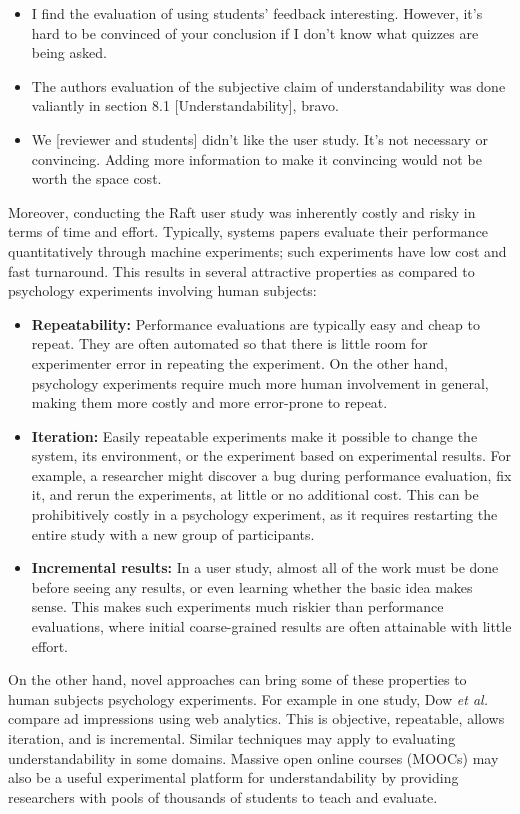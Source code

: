 \begin{itemize}
\item I find the evaluation of using students' feedback interesting.
However, it's hard to be convinced of your conclusion if I don't know
what quizzes are being asked.

\item The authors evaluation of the subjective claim of
understandability was done valiantly in section 8.1 [Understandability],
bravo.

\item We [reviewer and students] didn't like the user study. It's not
necessary or convincing. Adding more information to make it convincing
would not be worth the space cost.

\end{itemize}

Moreover, conducting the Raft user study was inherently costly and risky
in terms of time and effort. Typically, systems papers evaluate their
performance quantitatively through machine experiments; such experiments
have low cost and fast turnaround. This results in several attractive
properties as compared to psychology experiments involving human
subjects:
\begin{itemize}
\item \textbf{Repeatability:} Performance evaluations are typically
easy and cheap to repeat. They are often automated so that there is
little room for experimenter error in repeating the experiment. On the
other hand, psychology experiments require much more human involvement
in general, making them more costly and more error-prone to repeat.
\item \textbf{Iteration:} Easily repeatable experiments make it possible
to change the system, its environment, or the experiment based on
experimental results. For example, a researcher might discover a bug
during performance evaluation, fix it, and rerun the experiments, at
little or no additional cost. This can be prohibitively costly in a psychology
experiment, as it requires restarting the entire study with a new group
of participants.
\item \textbf{Incremental results:} In a user study, almost all of the
work must be done before seeing any results, or even learning whether
the basic idea makes sense. This makes such experiments much riskier
than performance evaluations, where initial coarse-grained results are
often attainable with little effort.
\end{itemize}

On the other hand, novel approaches can bring some of these properties
to human subjects psychology experiments. For example in one study, Dow
\emph{et al.}~\cite{Dow:2010} compare ad impressions using web
analytics. This is objective, repeatable, allows iteration, and is
incremental. Similar techniques may apply to evaluating
understandability in some domains. Massive open online courses (MOOCs)
may also be a useful experimental platform for understandability by
providing researchers with pools of thousands of students to teach and
evaluate.


